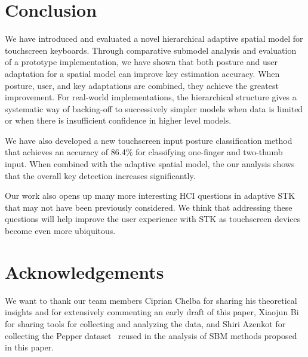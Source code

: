\documentclass{sigchi}
\begin{document}
\section{Conclusion}
We have introduced and evaluated a novel hierarchical adaptive spatial model for
touchscreen keyboards. Through comparative submodel analysis and evaluation of a prototype implementation, we have shown that both posture and user adaptation for a spatial model can improve key estimation accuracy. When posture, user, and key adaptations are combined, they 
achieve the greatest improvement. For real-world
implementations, the
hierarchical structure gives a systematic way of backing-off to successively simpler models  when data is limited
or when there is insufficient confidence in higher level models.

We have also developed a new touchscreen input posture classification method
that achieves an accuracy of 86.4\% for classifying one-finger and two-thumb input. When
combined with the adaptive spatial model, the our analysis shows that the overall key detection increases significantly.

Our work also opens up many more interesting HCI questions in adaptive STK
that may not have been previously considered. We think that addressing these questions
will help improve the user experience with STK as touchscreen
devices become even more ubiquitous.

\section{Acknowledgements}
We want to thank our team members
Ciprian Chelba for sharing his theoretical insights and for extensively 
commenting an early draft of this paper, Xiaojun Bi for sharing tools for
collecting and analyzing the data, and Shiri Azenkot for collecting the Pepper
dataset~\cite{Azenkot:2012} reused in the analysis of SBM methods proposed in this paper.

\small


\end{document}
